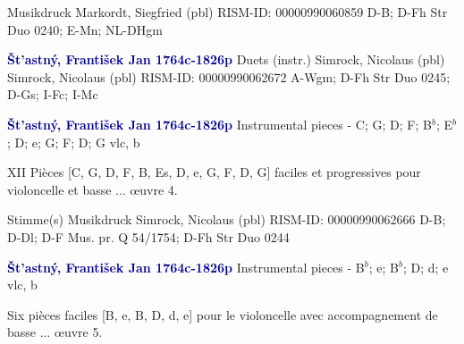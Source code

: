 \documentclass[twocolumn]{book}
\begin{document}
\newline Musikdruck
\newline Markordt, Siegfried  (pbl)
\newline RISM-ID: 00000990060859
\newline D-B; D-Fh  Str Duo 0240; E-Mn; NL-DHgm
\newline \par \vspace{7pt} \textcolor{darkblue}{\textbf{Št'astný, František Jan  1764c-1826p}}
\newline Duets (instr.)
\newline Simrock, Nicolaus  (pbl)
\newline Simrock, Nicolaus  (pbl)
\newline RISM-ID: 00000990062672
\newline A-Wgm; D-Fh  Str Duo 0245; D-Gs; I-Fc; I-Mc
\newline \par \vspace{7pt} \textcolor{darkblue}{\textbf{Št'astný, František Jan  1764c-1826p}}
\newline Instrumental pieces - C; G; D; F; B$^b$; E$^b$; D; e; G; F; D; G
\newline vlc, b
\newline \begin{itshape}XII Pièces [C, G, D, F, B, Es, D, e, G, F, D, G] faciles et progressives pour violoncelle et basse ... œuvre 4.\end{itshape} 
\newline \textcolor{darkblue}{}  Stimme(s)
\newline Musikdruck
\newline Simrock, Nicolaus  (pbl)
\newline RISM-ID: 00000990062666
\newline D-B; D-Dl; D-F  Mus. pr. Q 54/1754; D-Fh  Str Duo 0244
\newline \par \vspace{7pt} \textcolor{darkblue}{\textbf{Št'astný, František Jan  1764c-1826p}}
\newline Instrumental pieces - B$^b$; e; B$^b$; D; d; e
\newline vlc, b
\newline \begin{itshape}Six pièces faciles [B, e, B, D, d, e] pour le violoncelle avec accompagnement de basse ... œuvre 5.\end{itshape} 
\end{document}
